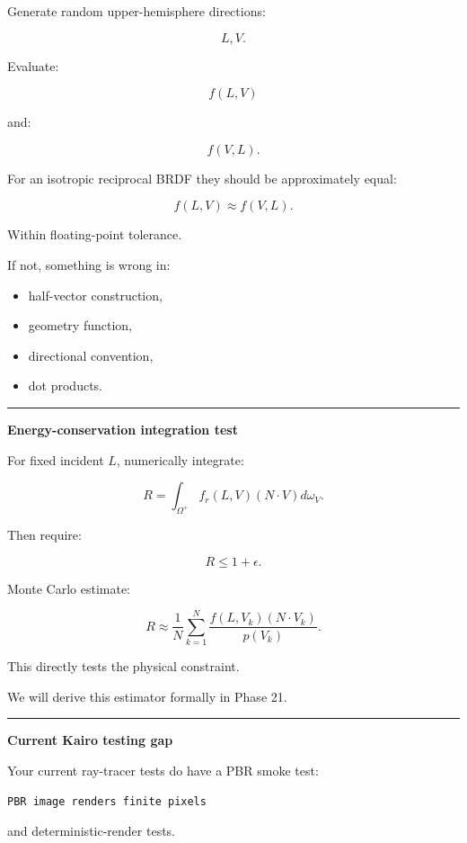 Generate random upper-hemisphere directions:

\[
L,V.
\]

Evaluate:

\[
f(L,V)
\]

and:

\[
f(V,L).
\]

For an isotropic reciprocal BRDF they should be approximately equal:

\[
\boxed{
f(L,V)
\approx
f(V,L).
}
\]

Within floating-point tolerance.

If not, something is wrong in:

\begin{itemize}
\tightlist
\item
  half-vector construction,
\item
  geometry function,
\item
  directional convention,
\item
  dot products.
\end{itemize}

\begin{center}\rule{0.5\linewidth}{0.5pt}\end{center}

\textbf{Energy-conservation integration test}

For fixed incident \(L\), numerically integrate:

\[
R=
\int_{\Omega^+}
f_r(L,V)
(N\cdot V)
d\omega_V.
\]

Then require:

\[
R\le1+\epsilon.
\]

Monte Carlo estimate:

\[
R
\approx
\frac1N
\sum_{k=1}^N
\frac{
f(L,V_k)
(N\cdot V_k)
}{
p(V_k)
}.
\]

This directly tests the physical constraint.

We will derive this estimator formally in Phase 21.

\begin{center}\rule{0.5\linewidth}{0.5pt}\end{center}

\textbf{Current Kairo testing gap}

Your current ray-tracer tests do have a PBR smoke test:

\begin{verbatim}
PBR image renders finite pixels
\end{verbatim}

and deterministic-render tests.

